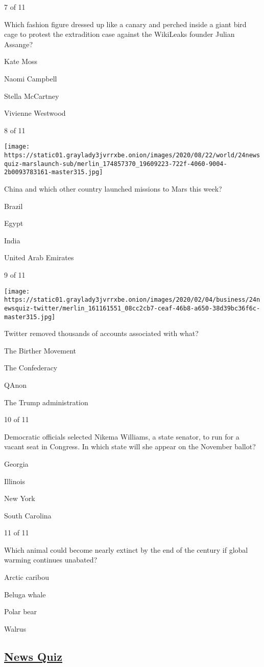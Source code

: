 7 of 11

Which fashion figure dressed up like a canary and perched inside a giant
bird cage to protest the extradition case against the WikiLeaks founder
Julian Assange?

Kate Moss

Naomi Campbell

Stella McCartney

Vivienne Westwood

8 of 11

\texttt{[image: https://static01.graylady3jvrrxbe.onion/images/2020/08/22/world/24newsquiz-marslaunch-sub/merlin\_174857370\_19609223-722f-4060-9004-2b0093783161-master315.jpg]}

China and which other country launched missions to Mars this week?

Brazil

Egypt

India

United Arab Emirates

9 of 11

\texttt{[image: https://static01.graylady3jvrrxbe.onion/images/2020/02/04/business/24newsquiz-twitter/merlin\_161161551\_08cc2cb7-ceaf-46b8-a650-38d39bc36f6c-master315.jpg]}

Twitter removed thousands of accounts associated with what?

The Birther Movement

The Confederacy

QAnon

The Trump administration

10 of 11

Democratic officials selected Nikema Williams, a state senator, to run
for a vacant seat in Congress. In which state will she appear on the
November ballot?

Georgia

Illinois

New York

South Carolina

11 of 11

Which animal could become nearly extinct by the end of the century if
global warming continues unabated?

Arctic caribou

Beluga whale

Polar bear

Walrus

\hypertarget{news-quiz}{%
\subsection{\texorpdfstring{\href{https://www.nytimes3xbfgragh.onion/spotlight/news-quiz}{News
Quiz}}{News Quiz}}\label{news-quiz}}

